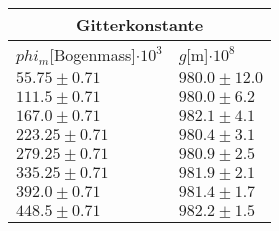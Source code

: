 \documentclass{article}
\begin{document}
\begin{tabular}{|p{3cm}|p{3cm}|}
\hline
\multicolumn{2}{|c|}{Gitterkonstante}\\
\hline
$phi_m$[Bogenmass]$\cdot 10^{3}$&$g$[m]$\cdot 10^{8}$\\
\hline
$55.75\pm0.71$&$980.0\pm 12.0$\\
$111.5\pm0.71$&$980.0\pm 6.2$\\
$167.0\pm0.71$&$982.1\pm 4.1$\\
$223.25\pm0.71$&$980.4\pm 3.1$\\
$279.25\pm0.71$&$980.9\pm 2.5$\\
$335.25\pm0.71$&$981.9\pm 2.1$\\
$392.0\pm0.71$&$981.4\pm 1.7$\\
$448.5\pm0.71$&$982.2\pm 1.5$\\
\hline
\end{tabular}
\end{document}
